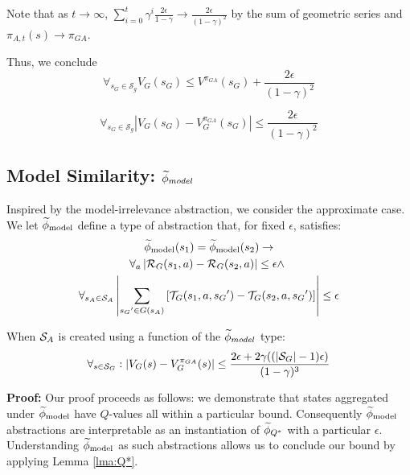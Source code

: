 Note that as $t \rightarrow \infty$, $\sum_{i=0}^{t}\gamma^i \frac{2\epsilon}{1-\gamma} \rightarrow \frac{2\epsilon}{(1-\gamma)^2}$ by the sum of geometric series and $\pi_{A,t}(s) \rightarrow \pi_{GA}$.

Thus, we conclude
\begin{equation*}
\forall_{s_G \in \mathcal{S}_g} V_G(s_G) \leq  V^{\pi_{GA}}(s_G) + \frac{2\epsilon}{(1-\gamma)^2}
\end{equation*}

\begin{equation*}
\forall_{s_G \in \mathcal{S}_g} \left | V_G(s_G) - V_G^{\pi_{GA}}(s_G) \right | \leq  \frac{2\epsilon}{(1-\gamma)^2}
\end{equation*}



\subsection{Model Similarity: $\widetilde \phi_{model}$}
\label{sec:model}

Inspired by the model-irrelevance abstraction, we consider the approximate case. 
\bdefn{$\epM$}
We let $\epM$ define a type of abstraction that, for fixed $\epsilon$, satisfies:
\begin{multline}
\widetilde \phi_{\text{model}}(s_1) = \widetilde \phi_{\text{model}}(s_2) \rightarrow \\
\forall_a \left| \mathcal{R}_G(s_1, a) - \mathcal{R}_G(s_2, a)\right| \leq \epsilon \wedge\ \\
\forall_{s_A \in \mathcal{S}_A} \left|\sum_{{s_G}' \in G(s_A)} \left[\mathcal{T}_G(s_1, a, {s_G}') - \mathcal{T}_G(s_2, a,{s_G}')\right] \right| \leq \epsilon
\end{multline}
\edefn

\begin{lma}
\label{lma:model}
When $\mathcal{S}_A$ is created using a function of the $\widetilde \phi_{model}$ type:
\begin{equation}
\forall_{s \in \mathcal{S}_G} : | V_G(s) - V_G^{\pi_{GA}}(s) | \leq \frac{2\epsilon + 2\gamma((|\mathcal{S}_G|-1)\epsilon)}{(1-\gamma)^3}
\end{equation}
\end{lma}

{\bf Proof:} Our proof proceeds as follows: we demonstrate that states aggregated under $\epM$ have $Q$-values all within a particular bound. Consequently $\epM$ abstractions are interpretable as an instantiation of $\widetilde \phi_{Q^*}$ with a particular $\epsilon$. Understanding $\epM$ as such abstractions allows us to conclude our bound by applying Lemma \ref{lma:Q*}.

